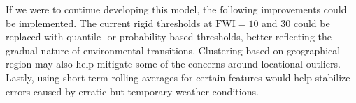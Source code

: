 \documentclass[11pt]{article}
\begin{document}
If we were to continue developing this model, the following improvements could be implemented. The current rigid thresholds at $\text{FWI} = 10$ and $30$ could be replaced with quantile- or probability-based thresholds, better reflecting the gradual nature of environmental transitions. Clustering based on geographical region may also help mitigate some of the concerns around locational outliers. Lastly, using short-term rolling averages for certain features would help stabilize errors caused by erratic but temporary weather conditions.

%
%
%
%
%
%
%
%
%
\end{document}
